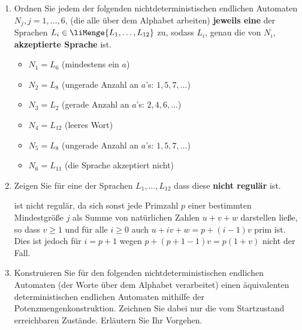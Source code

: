 \documentclass{lehramt-informatik-aufgabe}
\begin{document}
\begin{enumerate}

\item Ordnen Sie jedem der folgenden nichtdeterministischen endlichen
Automaten $N_j, j = 1,\dots,6$, (die alle über dem Alphabet
 arbeiten) \textbf{jeweils eine} der Sprachen $L_i \in
\liMenge{L_1, \dots , L_{12}}$ zu, sodass $L_i$, genau die von $N_i$,
\textbf{akzeptierte Sprache} ist.

\begin{liAntwort}
\begin{itemize}
\item $N_1 = L_6$ (mindestens ein $a$)

\item $N_2 = L_8$ (ungerade Anzahl an $a$’s: $1, 5, 7, \dots$)

\item $N_3 = L_2$ (gerade Anzahl an $a$’s: $2, 4, 6, \dots$)

\item $N_4 = L_{12}$ (leeres Wort)

\item $N_5 = L_8$ (ungerade Anzahl an $a$’s: $1, 5, 7, \dots$)

\item $N_6 = L_{11}$ (die Sprache akzeptiert nicht)
\end{itemize}
\end{liAntwort}


\item Zeigen Sie für eine der Sprachen $L_1, \dots, L_{12}$ dass diese
\textbf{nicht regulär} ist.

\begin{liAntwort}

ist nicht regulär, da sich sonst jede Primzahl $p$ einer bestimmten
Mindestgröße $j$ als Summe von natürlichen Zahlen $u + v + w$ darstellen
ließe, so dass $v \geq 1$ und für alle $i \geq 0$ auch $u + iv + w = p +
(i − 1)v$ prim ist. Dies ist jedoch für $i = p + 1$ wegen $p + (p + 1 −
1)v = p(1 + v)$ nicht der
Fall.
\end{liAntwort}


\item Konstruieren Sie für den folgenden nichtdeterministischen
endlichen Automaten (der Worte über dem Alphabet 
verarbeitet) einen äquivalenten deterministischen endlichen Automaten
mithilfe der Potenzmengenkonstruktion. Zeichnen Sie dabei nur die vom
Startzustand erreichbaren Zustände. Erläutern Sie Ihr Vorgehen.


\end{enumerate}
\end{document}
